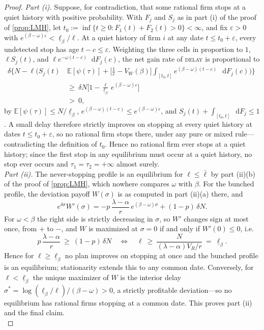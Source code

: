 \documentclass[12pt,reqno]{article}
\newcommand{\de}{\mathop{}\!\mathrm{d}}
\newcommand{\Ex}{\mathbb{E}}
\theoremstyle{definition} \newtheorem{example}{Example}
\theoremstyle{definition} \newtheorem{condition}{Condition}
\theoremstyle{definition} \newtheorem{corollary}{Corollary}
\theoremstyle{definition} \newtheorem{claim}{Claim}
\theoremstyle{definition} \newtheorem{definition}{Definition}
\theoremstyle{definition} \newtheorem{conjecture}{Conjecture}
\theoremstyle{definition} \newtheorem{Lemma}{Lemma}
\theoremstyle{definition} \newtheorem{lemma}{Lemma}
\theoremstyle{plain} \newtheorem{theorem}{Theorem}
\theoremstyle{definition} \newtheorem{assumption}{Assumption}
\theoremstyle{definition} \newtheorem*{assumptionnonumber}{Assumption}
\theoremstyle{definition} \newtheorem*{theoremNoNumber}{Proposition}
\theoremstyle{definition}
\theoremstyle{definition}\newtheorem{proposition}{Proposition}
\theoremstyle{definition} \newtheorem{result}{Result}
\theoremstyle{definition} \newtheorem*{definitionNoNumber}{Definition}
\theoremstyle{definition} \newtheorem{Definition}{Definition}
\theoremstyle{definition} \newtheorem*{DefinitionNoNumber}{Definition}
\theoremstyle{definition} \newtheorem*{fact}{Fact}
\theoremstyle{definition} \newtheorem*{property}{Property}
\theoremstyle{definition} \newtheorem{remark}{Remark}
\begin{document}
\begin{proof}
\noindent  \emph{Part (i).} Suppose, for contradiction, that some rational firm stops at a quiet history with positive probability. With $F_j$ and $S_j$ as in part (i) of the proof of \cref{prop:LMH}, let $t_0:=\inf\{t\ge0:F_1(t)+F_2(t)>0\}<\infty$, and fix $\varepsilon>0$ with $e^{(\beta-\omega)\varepsilon}<\underline\ell_\beta/\ell$. At a quiet history of firm $i$ at any date $t\le t_0+\varepsilon$, every undetected stop has age $t-c\le\varepsilon$. Weighting the three cells in proportion to $1$, $\ell S_j(t)$, and $\ell e^{-\omega(t-c)}\de F_j(c)$, the net gain rate of \textsc{delay} is proportional to
\begin{align*}
\delta\Big\{N-\ell\Big(S_j(t)\,&\Ex[\psi(\tau)]+\Big[\frac1r-V_W(\beta)\Big]\int_{[t_0,t]}e^{(\beta-\omega)(t-c)}\,\de F_j(c)\Big)\Big\}
\ \\ 
&\ge\ \delta N\Big[1-\frac{\ell}{\underline\ell_\beta}\,e^{(\beta-\omega)\varepsilon}\Big]\ \\
&>\ 0,    
\end{align*}
by $\Ex[\psi(\tau)]\le N/\underline\ell_\beta$, $e^{(\beta-\omega)(t-c)}\le e^{(\beta-\omega)\varepsilon}$, and $S_j(t)+\int_{[t_0,t]}\de F_j\le1$. A small delay therefore strictly improves on stopping at every quiet history at dates $t\le t_0+\varepsilon$, so no rational firm stops there, under any pure or mixed rule---contradicting the definition of $t_0$. Hence no rational firm ever stops at a quiet history; since the first stop in any equilibrium must occur at a quiet history, no stop ever occurs and $\tau_1=\tau_2=+\infty$ almost surely. \\ 

\noindent  \emph{Part (ii).} The never-stopping profile is an equilibrium for $\ell\le\bar\ell$ by part (ii)(b) of the proof of \cref{prop:LMH}, which nowhere compares $\omega$ with $\beta$. For the bunched profile, the deviation payoff $W(\sigma)$ is as computed in part (ii)(a) there, and
\[
e^{\delta\sigma}W'(\sigma)=-p\,\frac{\lambda-\alpha}{r}\,e^{(\beta-\omega)\sigma}+(1-p)\,\delta N .
\]
For $\omega<\beta$ the right side is strictly decreasing in $\sigma$, so $W'$ changes sign at most once, from $+$ to $-$, and $W$ is maximized at $\sigma=0$ if and only if $W'(0)\le0$, i.e.
\[
p\,\frac{\lambda-\alpha}{r}\ \ge\ (1-p)\,\delta N
\quad\Longleftrightarrow\quad
\ell\ \ge\ \frac{N}{(\lambda-\alpha)V_R/r}\ =\ \underline\ell_\beta .
\]
Hence for $\ell\ge\underline\ell_\beta$ no plan improves on stopping at once and the bunched profile is an equilibrium; stationarity extends this to any common date. Conversely, for $\ell<\underline\ell_\beta$ the unique maximizer of $W$ is the interior delay $\sigma^\ast=\log(\underline\ell_\beta/\ell)/(\beta-\omega)>0$, a strictly profitable deviation---so no equilibrium has rational firms stopping at a common date. This proves part (ii) and the final claim. \\ 


\end{proof}
\end{document}
